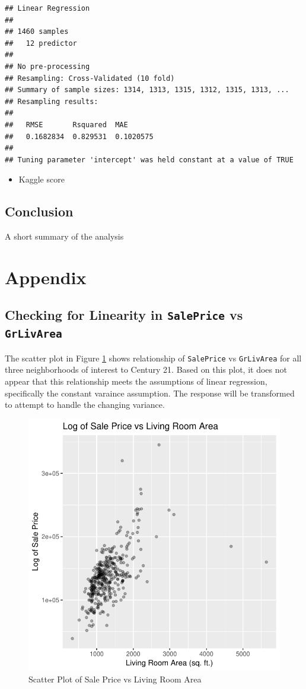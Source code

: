 \documentclass[american,]{article}
\providecommand{\tightlist}{%
  \setlength{\itemsep}{0pt}\setlength{\parskip}{0pt}}
\theoremstyle{definition}
\theoremstyle{definition}
\theoremstyle{definition}
\theoremstyle{remark}
\begin{document}
\begin{verbatim}
## Linear Regression 
## 
## 1460 samples
##   12 predictor
## 
## No pre-processing
## Resampling: Cross-Validated (10 fold) 
## Summary of sample sizes: 1314, 1313, 1315, 1312, 1315, 1313, ... 
## Resampling results:
## 
##   RMSE       Rsquared  MAE      
##   0.1682834  0.829531  0.1020575
## 
## Tuning parameter 'intercept' was held constant at a value of TRUE
\end{verbatim}

\begin{itemize}
\tightlist
\item
  Kaggle score
\end{itemize}

\hypertarget{conclusion-1}{%
\subsection{Conclusion}\label{conclusion-1}}

A short summary of the analysis

\hypertarget{appendix}{%
\section{Appendix}\label{appendix}}

\hypertarget{checking-for-linearity-in-saleprice-vs-grlivarea}{%
\subsection{\texorpdfstring{Checking for Linearity in \texttt{SalePrice}
vs
\texttt{GrLivArea}}{Checking for Linearity in SalePrice vs GrLivArea}}\label{checking-for-linearity-in-saleprice-vs-grlivarea}}

\label{appendix:linearity}

The scatter plot in Figure \ref{fig:scatter-plot} shows relationship of
\texttt{SalePrice} vs \texttt{GrLivArea} for all three neighborhoods of
interest to Century 21. Based on this plot, it does not appear that this
relationship meets the assumptions of linear regression, specifically
the constant varaince assumption. The response will be transformed to
attempt to handle the changing variance.

\begin{figure}[htbp]

{\centering \includegraphics[width=0.45\linewidth]{HousePriceRegressionAnalysis_files/figure-latex/scatter-plot-1} 

}

\caption{Scatter Plot of Sale Price vs Living Room Area}\label{fig:scatter-plot}
\end{figure}
\end{document}
